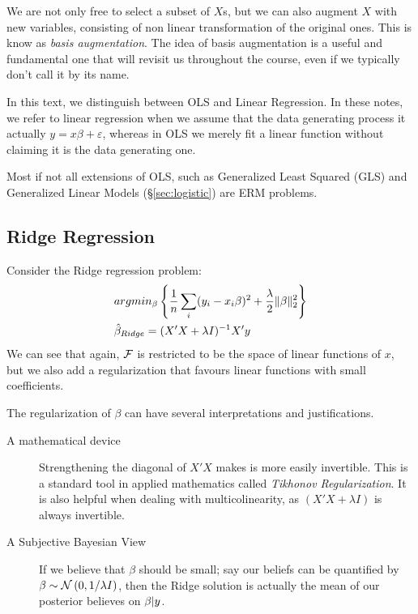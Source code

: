 We are not only free to select a subset of $X$s, but we can also augment $X$ with new variables, consisting of non linear transformation of the original ones. This is know as \emph{basis augmentation}. 
The idea of basis augmentation is a useful and fundamental one that will revisit us throughout the course, even if we typically don't call it by its name.

\begin{remark}
In this text, we distinguish between OLS and Linear Regression. In these notes, we refer to linear regression when we assume that the data generating process it actually $y=x\beta+\varepsilon$, whereas in OLS we merely fit a linear function without claiming it is the data generating one.
\end{remark}


\begin{remark}
Most if not all extensions of OLS, such as Generalized Least Squared (GLS) and Generalized Linear Models (\S\ref{sec:logistic}) are ERM problems. 
\end{remark}




\subsection{Ridge Regression}
\label{sec:ridge}

Consider the Ridge regression problem:
\begin{align}
\label{eq:ridge}
	& argmin_{\beta}\left\{ \frac{1}{n}\sum_i (y_i-x_i\beta)^2 + \frac{\lambda}{2}\Vert \beta \Vert_2^2 \right\} \\
	& \hat{\mathbf{\beta}}_{Ridge}= (X'X+\lambda I)^{-1} X'y
\end{align}
We can see that again, $\mathcal{F}$ is restricted to be the space of linear functions of $x$, but we also add a regularization that favours linear functions with small coefficients.

The regularization of $\beta$ can have several interpretations and justifications.
\begin{description}
\item[A mathematical device] Strengthening the diagonal of $X'X$ makes is more easily invertible. This is a standard tool in applied mathematics called \emph{Tikhonov Regularization}. It is also helpful when dealing with multicolinearity, as $(X'X+\lambda I)$ is always invertible.
\item[A Subjective Bayesian View] If we believe that $\beta$ should be small; say our beliefs can be quantified by $\mathbf{\beta} \sim \mathcal{N}\left(0,1/\lambda I\right)$, then the Ridge solution is actually the mean of our posterior believes on $\mathbf{\beta}|y$.
\end{description}

